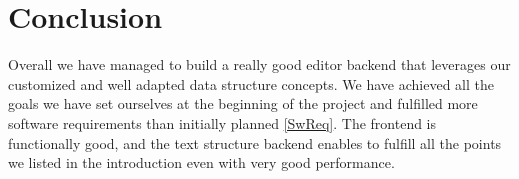 \section{Conclusion}\label{sec:conclusion}
Overall we have managed to build a really good editor backend that leverages our customized and well adapted data structure concepts. We have achieved all the goals we have set ourselves at the beginning of the project and fulfilled more software requirements than initially planned \ref{SwReq}. The frontend is functionally good, and the text structure backend enables to fulfill all the points we listed in the introduction even with very good performance.
